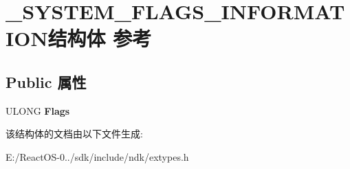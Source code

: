 \hypertarget{struct___s_y_s_t_e_m___f_l_a_g_s___i_n_f_o_r_m_a_t_i_o_n}{}\section{\+\_\+\+S\+Y\+S\+T\+E\+M\+\_\+\+F\+L\+A\+G\+S\+\_\+\+I\+N\+F\+O\+R\+M\+A\+T\+I\+O\+N结构体 参考}
\label{struct___s_y_s_t_e_m___f_l_a_g_s___i_n_f_o_r_m_a_t_i_o_n}
\subsection*{Public 属性}
\begin{DoxyCompactItemize}
\item 
\mbox{\label{struct___s_y_s_t_e_m___f_l_a_g_s___i_n_f_o_r_m_a_t_i_o_n_a4ddf4b0cf5323d0f385d1fcf356c5b01}} 
U\+L\+O\+NG {\bfseries Flags}
\end{DoxyCompactItemize}


该结构体的文档由以下文件生成\+:\begin{DoxyCompactItemize}
\item 
E\+:/\+React\+O\+S-\/0../sdk/include/ndk/extypes.\+h\end{DoxyCompactItemize}
